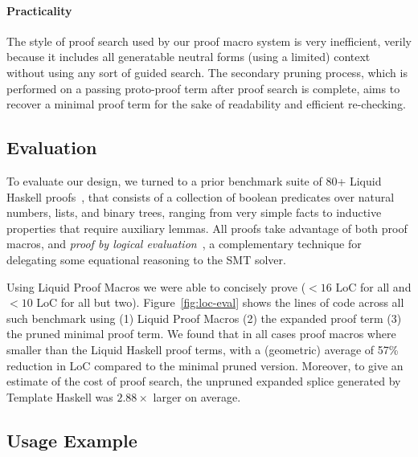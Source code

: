 \paragraph{Practicality}
%
The style of proof search used by our proof macro system is very
inefficient, verily because it includes all generatable neutral forms
(using a limited) context without using any sort of guided search. The
secondary pruning process, which is performed on a passing proto-proof
term after proof search is complete, aims to recover a minimal proof
term for the sake of readability and efficient re-checking.

\subsection{Evaluation}
\label{sec:eval-eval}

To evaluate our design, we turned to a prior benchmark suite of 80+
Liquid Haskell proofs~\cite{TacticThesis}, that consists of a
collection of boolean predicates over natural numbers, lists, and
binary trees, ranging from very simple facts to inductive properties
that require auxiliary lemmas. All proofs take advantage of both proof
macros, and {\em proof by logical evaluation}~\cite{VazouTCSNWJ18}, a
complementary technique for delegating some equational reasoning to
the SMT solver.

Using Liquid Proof Macros we were able to concisely prove ($<16$ LoC
for all and $<10$ LoC for all but two). Figure~\ref{fig:loc-eval}
shows the lines of code across all such benchmark using (1) Liquid
Proof Macros (2) the expanded proof term (3) the pruned minimal proof
term. We found that in all cases proof macros where smaller than the
Liquid Haskell proof terms, with a (geometric) average of 57\%
reduction in LoC compared to the minimal pruned version. Moreover, to
give an estimate of the cost of proof search, the unpruned expanded
splice generated by Template Haskell was $2.88\times$ larger on
average.

\subsection{Usage Example}
\label{sec:example}



